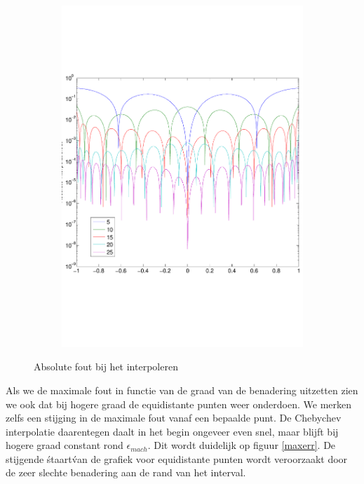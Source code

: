 \documentclass[a4paper, 12pt, titlepage]{report}
\begin{document}
\begin{figure}
\begin{subfigure}{0.5\textwidth}
 \includegraphics[width=\textwidth]{errorExp2.pdf}
 \end{subfigure}
 
 \caption{Absolute fout bij het interpoleren}
 \label{errpol}
 \end{figure}
 
 Als we de maximale fout in functie van de graad van de benadering uitzetten zien we ook dat bij hogere graad de equidistante punten weer onderdoen. We merken zelfs een stijging in de maximale fout vanaf een bepaalde punt. De Chebychev interpolatie daarentegen daalt in het begin ongeveer even snel, maar blijft bij hogere graad constant rond $\epsilon_{mach}$. Dit wordt duidelijk op figuur \ref{maxerr}. De stijgende \'staart\' van de grafiek voor equidistante punten wordt veroorzaakt door de zeer slechte benadering aan de rand van het interval. \\
 
\end{document}
